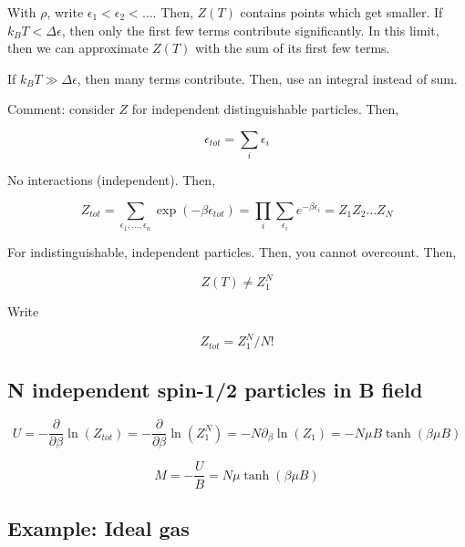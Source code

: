 \documentclass{article}
\newtheorem{one minute paper}[theorem]{One Minute Paper}
\begin{document}
With $\rho$, write $\epsilon_1 < \epsilon_2 < \dots$. Then, $Z(T)$ contains points which get smaller. If $k_B T < \Delta \epsilon$, then only the first few terms contribute significantly. In this limit, then we can approximate $Z(T)$ with the sum of its first few terms. 

If $k_B T \gg \Delta \epsilon$, then many terms contribute. Then, use an integral instead of sum.

Comment: consider $Z$ for independent distinguishable particles. Then, 

\begin{equation}
    \epsilon_{tot} = \sum_i \epsilon_i
\end{equation}

No interactions (independent). Then, 

\begin{equation}
    Z_{tot} = \sum_{\epsilon_1, \dots, \epsilon_n} \exp(-\beta \epsilon_{tot}) = \prod_i \sum_{\epsilon_i}e^{-\beta \epsilon_i} = Z_1Z_2\dots Z_N
\end{equation}

For indistinguishable, independent particles. Then, you cannot overcount. Then, 

\begin{equation}
    Z(T) \neq Z_1^N
\end{equation}

Write 

\begin{equation}
    Z_{tot} = Z_1^N/N!
\end{equation}

\subsection*{N independent spin-1/2 particles in B field}

\begin{equation}
    U = -\frac{\partial}{\partial \beta}\ln(Z_{tot}) = -\frac{\partial}{\partial \beta}\ln(Z_1^N) = -N\partial_{\beta}\ln(Z_1) = -N\mu B \tanh(\beta \mu B)
\end{equation}

\begin{equation}
    M = -\frac{U}{B} = N \mu \tanh(\beta \mu B)
\end{equation}

\subsection*{Example: Ideal gas}
\end{document}

